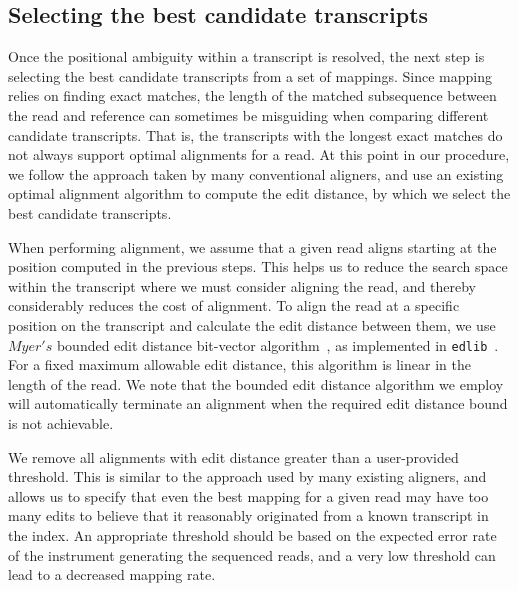 \subsection{Selecting the best candidate transcripts}
Once the positional ambiguity within a transcript is resolved, the next step 
is selecting the best candidate transcripts from a set of mappings. 
Since mapping relies on finding exact matches, the length of the matched 
subsequence between the read and reference can sometimes be misguiding when 
comparing different candidate transcripts. 
That is, the transcripts with the longest exact matches do not always 
support optimal alignments for a read.  At this point in our procedure, 
we follow the approach taken by many conventional aligners, and use an 
existing optimal alignment algorithm to compute the edit distance, by which 
we select the best candidate transcripts.

When performing alignment, we assume that a given read aligns starting at the position computed in the previous steps.  This helps us to reduce the search space within the transcript where we must consider aligning the read, and thereby considerably reduces the cost of alignment. To align the read at a specific position on the transcript and calculate the edit distance between them, we use $Myer's$ bounded edit distance bit-vector algorithm~\citep{myers1999fast}, as implemented in \texttt{edlib}~\citep{edlib}.  For a fixed maximum allowable edit distance, this algorithm is linear in the length of the read. We note that the bounded edit distance algorithm we employ will automatically terminate an alignment when the required edit distance bound is not achievable.

We remove all alignments with edit distance greater than a user-provided threshold. This is similar to the approach used by many existing aligners, and allows us to specify that even the best mapping for a given read may have too many edits to believe that it reasonably originated from a known transcript in the index. An appropriate threshold should be based on the expected error rate of the instrument generating the sequenced reads, and a very low threshold can lead to a decreased mapping rate.

